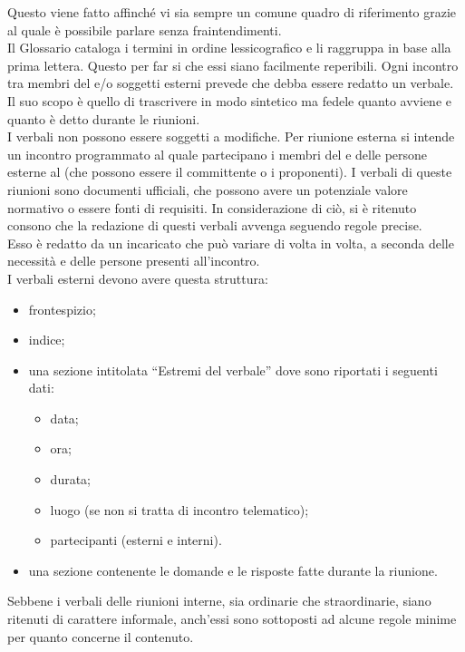 					Questo viene fatto affinché vi sia sempre un comune quadro di riferimento grazie al quale è possibile parlare senza fraintendimenti.\\
					Il Glossario cataloga i termini in ordine lessicografico e li raggruppa in base alla prima lettera. Questo per far si che essi siano facilmente reperibili.
				 \label{sec:verbali}
					Ogni incontro tra membri del  e/o soggetti esterni prevede che debba essere redatto un verbale. Il suo scopo è quello di trascrivere in modo sintetico ma fedele quanto avviene e quanto è detto durante le riunioni.\\
					I verbali non possono essere soggetti a modifiche.
						Per riunione esterna si intende un incontro programmato al quale partecipano i membri del  e delle persone esterne al  (che possono essere il committente o i proponenti). I verbali di queste riunioni sono documenti ufficiali, che possono avere un potenziale valore normativo o essere fonti di requisiti. In considerazione di ciò, si è ritenuto consono che la redazione di questi verbali avvenga seguendo regole precise.\\
						Esso è redatto da un incaricato che può variare di volta in volta, a seconda delle necessità e delle persone presenti all’incontro.\\
						I verbali esterni devono avere questa struttura:
						\begin{itemize}
							\item frontespizio;
							\item indice;
							\item una sezione intitolata “Estremi del verbale” dove sono riportati i seguenti dati:
							\begin{itemize}
								\item data;
								\item ora;
								\item durata;
								\item luogo (se non si tratta di incontro telematico);
								\item partecipanti (esterni e interni).
							\end{itemize}
							\item una sezione contenente le domande e le risposte fatte durante la riunione.
						\end{itemize}
						Sebbene i verbali delle riunioni interne, sia ordinarie che straordinarie, siano ritenuti di carattere informale, anch'essi sono sottoposti ad alcune regole minime per quanto concerne il contenuto.  \\
